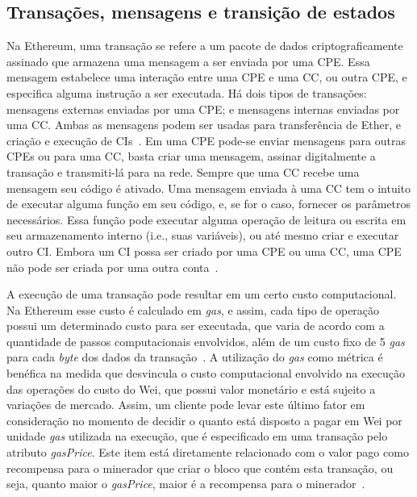 \subsection{Transações, mensagens e transição de estados} \label{tex:fund:ethereum:transacao-msgs}

Na Ethereum, uma transação se refere a um pacote de dados criptograficamente assinado que armazena uma mensagem a ser enviada por uma CPE. Essa mensagem estabelece uma interação entre uma CPE e uma CC, ou outra CPE, e especifica alguma instrução a ser executada. Há dois tipos de transações: mensagens externas enviadas por uma CPE; e mensagens internas enviadas por uma CC. Ambas as mensagens podem ser usadas para transferência de Ether, e criação e execução de CIs~\cite{wood2014ethereum-yellow-paper}. Em uma CPE pode-se enviar mensagens para outras CPEs ou para uma CC, basta criar uma mensagem, assinar digitalmente a transação e transmiti-lá para na rede. Sempre que uma CC recebe uma mensagem seu código é ativado. Uma mensagem enviada à uma CC tem o intuito de executar alguma função em seu código, e, se for o caso, fornecer os parâmetros necessários. Essa função pode executar alguma operação de leitura ou escrita em seu armazenamento interno (i.e., suas variáveis), ou até mesmo criar e executar outro CI. Embora um CI possa ser criado por uma CPE ou uma CC, uma CPE não pode ser criada por uma outra conta~\cite{ethereum2014whitepaper, chen2020survey-ethereum-acm}.

A execução de uma transação pode resultar em um certo custo computacional. Na Ethereum esse custo é calculado em \textit{gas}, e assim, cada tipo de operação possui um determinado custo para ser executada, que varia de acordo com a quantidade de passos computacionais envolvidos, além de um custo fixo de 5 \textit{gas} para cada \textit{byte} dos dados da transação~\cite{wood2014ethereum-yellow-paper}. A utilização do \textit{gas} como métrica é benéfica na medida que desvincula o custo computacional envolvido na execução das operações do custo do Wei, que possui valor monetário e está sujeito a variações de mercado. Assim, um cliente pode levar este último fator em consideração no momento de decidir o quanto está disposto a pagar em Wei por unidade \textit{gas} utilizada na execução, que é especificado em uma transação pelo atributo \textit{gasPrice}. Este item está diretamente relacionado com o valor pago como recompensa para o minerador que criar o bloco que contém esta transação, ou seja, quanto maior o \textit{gasPrice}, maior é a recompensa para o minerador~\cite{wang2019detecting-nondeterministic-26}.

